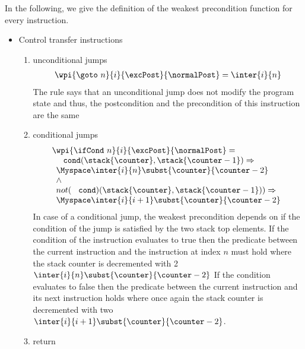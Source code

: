  In the following, we give the definition of the weakest precondition function for every instruction.


\begin{itemize}	
\item Control transfer instructions
\begin{enumerate}
 \item unconditional jumps \\
  $$\begin{array}{l} \wpi{\goto \  n }{i} {\excPost}{\normalPost} =   \inter{i}{n}  \end{array} $$
  The rule says that an unconditional jump does not modify the program state and thus, the postcondition and the precondition of this instruction
  are the same

\item conditional jumps
  $$ \begin{array}{l}
          \wpi{ \ifCond  \  n }{i}{\excPost}{\normalPost} =\\
	   \begin{array}{l} 
                  \mbox{ \rm \texttt{ cond}} ( \stack{\counter}, \stack{\counter - 1} ) \Rightarrow \\
                  \Myspace \inter{i}{n}\subst{\counter}{ \counter - 2 } \\
			 \wedge  \\
		  not(\mbox{ \rm \texttt{ cond}})( \stack{\counter},\stack{\counter - 1} ))  \Rightarrow \\
		  \Myspace \inter{i}{i+1}\subst{\counter}{\counter - 2} 
           \end{array}
  \end{array}$$
   In case of a conditional jump, the weakest precondition depends on if  the condition of the jump is satisfied
   by the two stack top elements. %
   If the condition of the instruction evaluates to true then the predicate between the current instruction and
   the instruction at index $n$ must hold  where the stack counter is decremented with 2 $\inter{i}{n}\subst{\counter}{ \counter - 2} $ 
   If the condition evaluates to false then the predicate between the current instruction and its next instruction holds where once again the stack counter
   is decremented with two $ \inter{i}{i+1}\subst{\counter}{\counter - 2} $. 

 \item return 
 

\end{enumerate}
\end{itemize}
